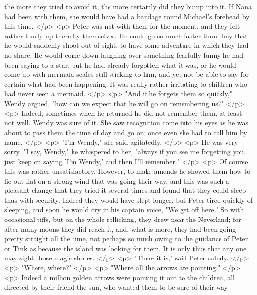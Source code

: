      the more they tried to avoid it, the more certainly did they bump into it.
      If Nana had been with them, she would have had a bandage round Michael's
      forehead by this time.
    </p>
    <p>
      Peter was not with them for the moment, and they felt rather lonely up
      there by themselves. He could go so much faster than they that he would
      suddenly shoot out of sight, to have some adventure in which they had no
      share. He would come down laughing over something fearfully funny he had
      been saying to a star, but he had already forgotten what it was, or he
      would come up with mermaid scales still sticking to him, and yet not be
      able to say for certain what had been happening. It was really rather
      irritating to children who had never seen a mermaid.
    </p>
    <p>
      "And if he forgets them so quickly," Wendy argued, "how can we expect that
      he will go on remembering us?"
    </p>
    <p>
      Indeed, sometimes when he returned he did not remember them, at least not
      well. Wendy was sure of it. She saw recognition come into his eyes as he
      was about to pass them the time of day and go on; once even she had to
      call him by name.
    </p>
    <p>
      "I'm Wendy," she said agitatedly.
    </p>
    <p>
      He was very sorry. "I say, Wendy," he whispered to her, "always if you see
      me forgetting you, just keep on saying 'I'm Wendy,' and then I'll
      remember."
    </p>
    <p>
      Of course this was rather unsatisfactory. However, to make amends he
      showed them how to lie out flat on a strong wind that was going their way,
      and this was such a pleasant change that they tried it several times and
      found that they could sleep thus with security. Indeed they would have
      slept longer, but Peter tired quickly of sleeping, and soon he would cry
      in his captain voice, "We get off here." So with occasional tiffs, but on
      the whole rollicking, they drew near the Neverland; for after many moons
      they did reach it, and, what is more, they had been going pretty straight
      all the time, not perhaps so much owing to the guidance of Peter or Tink
      as because the island was looking for them. It is only thus that any one
      may sight those magic shores.
    </p>
    <p>
      "There it is," said Peter calmly.
    </p>
    <p>
      "Where, where?"
    </p>
    <p>
      "Where all the arrows are pointing."
    </p>
    <p>
      Indeed a million golden arrows were pointing it out to the children, all
      directed by their friend the sun, who wanted them to be sure of their way
